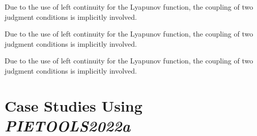 \documentclass[twocolumn]{autart}    %
\begin{document}
\begin{rmk}
    Due to the use of left continuity for the Lyapunov function, the coupling of two judgment conditions is implicitly involved.
\end{rmk}

\begin{rmk}
    Due to the use of left continuity for the Lyapunov function, the coupling of two judgment conditions is implicitly involved.
\end{rmk}

\begin{rmk}
    Due to the use of left continuity for the Lyapunov function, the coupling of two judgment conditions is implicitly involved.
\end{rmk}


\section{Case Studies Using \emph{PIETOOLS2022a}}
\end{document}

